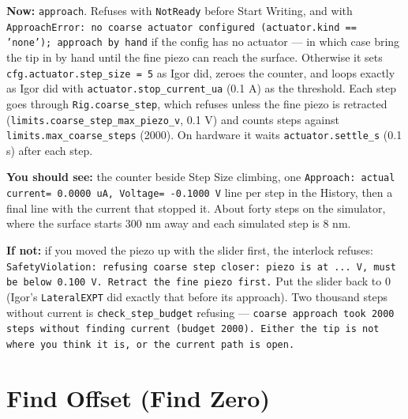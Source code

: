 \textbf{Now:} \texttt{approach}. Refuses with \texttt{Not\discretionary{}{}{}Ready} before Start Writing, and with \texttt{Approach\discretionary{}{}{}Error: no coarse actuator configured (actuator.\discretionary{}{}{}kind == 'none'); approach by hand} if the config has no actuator --- in which case bring the tip in by hand until the fine piezo can reach the surface. Otherwise it sets \texttt{cfg.\discretionary{}{}{}actuator.\discretionary{}{}{}step\_\discretionary{}{}{}size = 5} as Igor did, zeroes the counter, and loops exactly as Igor did with \texttt{actuator.\discretionary{}{}{}stop\_\discretionary{}{}{}current\_\discretionary{}{}{}ua} (0.1 \textmu{}A) as the threshold. Each step goes through \texttt{Rig.\discretionary{}{}{}coarse\_\discretionary{}{}{}step}, which refuses unless the fine piezo is retracted (\texttt{limits.\discretionary{}{}{}coarse\_\discretionary{}{}{}step\_\discretionary{}{}{}max\_\discretionary{}{}{}piezo\_\discretionary{}{}{}v}, 0.1 V) and counts steps against \texttt{limits.\discretionary{}{}{}max\_\discretionary{}{}{}coarse\_\discretionary{}{}{}steps} (2000). On hardware it waits \texttt{actuator.\discretionary{}{}{}settle\_\discretionary{}{}{}s} (0.1 s) after each step.

\textbf{You should see:} the counter beside Step Size climbing, one \texttt{Approach: actual current= 0.\discretionary{}{}{}0000 u\discretionary{}{}{}A,\discretionary{}{}{} Voltage= -0.\discretionary{}{}{}1000 V} line per step in the History, then a final line with the current that stopped it. About forty steps on the simulator, where the surface starts 300 nm away and each simulated step is 8 nm.

\textbf{If not:} if you moved the piezo up with the slider first, the interlock refuses: \texttt{Safety\discretionary{}{}{}Violation: refusing coarse step closer: piezo is at .\discretionary{}{}{}.\discretionary{}{}{}.\discretionary{}{}{} V,\discretionary{}{}{} must be below 0.\discretionary{}{}{}100 V.\discretionary{}{}{} Retract the fine piezo first.\discretionary{}{}{}} Put the slider back to 0 (Igor's \texttt{Lateral\discretionary{}{}{}EXPT} did exactly that before its approach). Two thousand steps without current is \texttt{check\_\discretionary{}{}{}step\_\discretionary{}{}{}budget} refusing --- \texttt{coarse approach took 2000 steps without finding current (budget 2000).\discretionary{}{}{} Either the tip is not where you think it is,\discretionary{}{}{} or the current path is open.\discretionary{}{}{}}

\section{Find Offset (Find Zero)}

